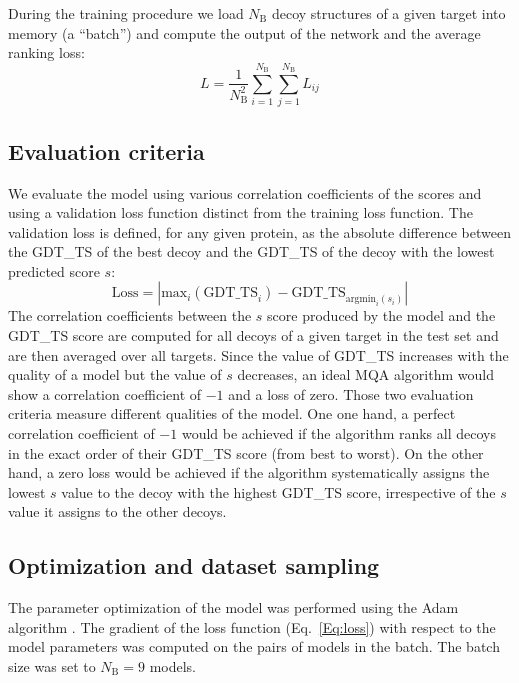 \documentclass{bioinfo}
\begin{document}
During the training procedure we load $N_\text{B}$ decoy structures of
a given target into memory (a ``batch'') and compute the output of the
network and the average ranking loss:
\begin{equation}
L = \frac{1}{N_\text{B}^2} \sum_{i=1}^{N_\text{B}}\sum_{j=1}^{N_\text{B}} L_{ij}
\label{Eq:loss}
\end{equation}


\subsection{Evaluation criteria}

We evaluate the model using various correlation coefficients of the
scores and using a validation loss function distinct from the training loss
function. The validation loss is defined, for any given protein, as the
absolute difference between the GDT\_TS of the best decoy and the
GDT\_TS of the decoy with the lowest predicted score $s$:
\begin{equation}
\mathrm{Loss} = \left| \mathrm{max}_i(\text{GDT\_TS}_i) - \text{GDT\_TS}_{\mathrm{argmin}_i(s_i)} \right|
\end{equation}
The correlation coefficients between the $s$ score produced by the
model and the GDT\_TS score are computed for all decoys of a given
target in the test set and are then averaged over all targets. Since
the value of GDT\_TS increases with the quality of a model but the
value of $s$ decreases, an ideal MQA algorithm would show a correlation
coefficient of $-1$ and a loss of zero.
Those two evaluation criteria measure different qualities of the
model. One one hand, a perfect correlation coefficient of $-1$ would
be achieved if the algorithm ranks all decoys in the exact
order of their GDT\_TS score (from best to worst). On the other hand,
a zero loss would be achieved if the algorithm systematically assigns
the lowest $s$ value to the decoy with the highest GDT\_TS score,
irrespective of the $s$ value it assigns to the other decoys.


\subsection{Optimization and dataset sampling}

The parameter optimization of the model was performed using the Adam
algorithm \citep{kingma2014adam}. The gradient of the loss function (Eq.~\ref{Eq:loss})
with respect to the model parameters was computed on the pairs of
models in the batch. The batch size was set to $N_\text{B} = 9$
models.
\end{document}
